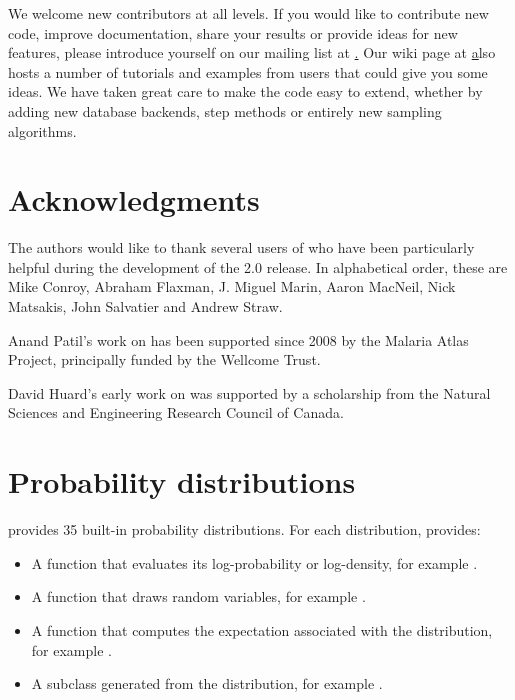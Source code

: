 \documentclass[]{jss}
\begin{document}
We welcome new contributors at all levels. If you would like to contribute new code, improve documentation, share your results or provide ideas for new features, please introduce yourself on our mailing list at \href{pymc@googlegroups.com}. Our wiki page at \href{http://code.google.com/p/pymc/w/list} also hosts a number of tutorials and examples from users that could give you some ideas. We have taken great care to make the code easy to extend, whether by adding new database backends, step methods or entirely new sampling algorithms.





\section[Acknowledgments]{Acknowledgments}
\label{chap:acknowledge}
The authors would like to thank several users of  who have been particularly helpful during the development of the 2.0 release. In alphabetical order, these are Mike Conroy, Abraham Flaxman, J. Miguel Marin, Aaron MacNeil, Nick Matsakis, John Salvatier and Andrew Straw.

Anand Patil's work on  has been supported since 2008 by the Malaria Atlas Project, principally funded by the Wellcome Trust.

David Huard's early work on  was supported by a scholarship from the Natural Sciences and Engineering Research Council of Canada. 
\newpage
\appendix

\section[Distributions]{Probability distributions}
\label{chap:distributions}


 provides 35 built-in probability distributions. For each distribution,  provides:
\begin{itemize}
    \item A function that evaluates its log-probability or log-density, for example .
    \item A function that draws random variables, for example .
    \item A function that computes the expectation associated with the distribution, for example .
    \item A  subclass generated from the distribution, for example .
\end{itemize}
\end{document}
